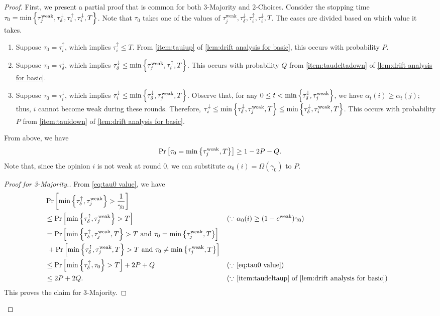 \documentclass[letterpaper,11pt]{article}
\newcommand{\alphanorm}{\gamma}
\newcommand{\cweak}{c^{\mathrm{weak}}}
\newcommand{\taudeltaup}{\tau^{\uparrow}_\delta}
\newcommand{\taudeltadown}{\tau^{\downarrow}_\delta}
\newcommand{\tauiup}{\tau^{\uparrow}_i}
\newcommand{\tauidown}{\tau^{\downarrow}_i}
\newcommand{\tauiweak}{\tau^{\mathrm{weak}}_i}
\newcommand{\taujweak}{\tau^{\mathrm{weak}}_j}
\begin{document}
\begin{proof}
  First, we present a partial proof that is common for both 3-Majority and 2-Choices.
  Consider the stopping time
  $ \tau_0 = \min\qty{ \taujweak,\taudeltadown,\tauiup,\tauidown, T } $.
  Note that $ \tau_0 $ takes one of the values of $ \taujweak,\taudeltadown,\tauiup,\tauidown,T$.
  The cases are divided based on which value it takes.
  \begin{enumerate}
  \item Suppose $ \tau_0 = \tauiup$, which implies $ \tauiup \le T $. From \cref{item:tauiup} of \cref{lem:drift analysis for basic}, this occurs with probability $P$. \label{item:multi tauiup}
  \item Suppose $ \tau_0 = \taudeltadown$, which implies $ \taudeltadown \le \min\qty{ \taujweak, \tauiup, T }$. This occurs with probability $ Q $ from \cref{item:taudeltadown} of \cref{lem:drift analysis for basic}. \label{item:multi taudeltadown}
  \item Suppose $ \tau_0 = \tauidown$, which implies $ \tauidown\le \min\qty{ \taudeltadown, \taujweak, T }$.
    Observe that, for any $ 0\le t < \min\qty{\taudeltadown,\taujweak} $, we have $ \alpha_t(i)\ge \alpha_t(j) $; thus, $ i $ cannot become weak during these rounds. Therefore, $ \tauidown\le \min\qty{ \taudeltadown, \taujweak, T } \le \min\qty{ \taudeltadown, \tauiweak, T }  $.  This occurs with probability $ P $ from \cref{item:tauidown} of \cref{lem:drift analysis for basic}. 
    \label{item:multi tauidown}
  \end{enumerate}
  From above, we have
  \begin{align} 
     \Pr\qty[ \tau_0 = \min\qty{\taujweak,T} ] \ge 1-2P-Q.  \label{eq:tau0 value}
  \end{align}
  Note that, since the opinion $ i $ is not weak at round $ 0 $, we can substitute $ \alpha_0(i)=\Omega(\alphanorm_0) $ to $ P $.

  \begin{proof}[Proof for 3-Majority.]
  From \cref{eq:tau0 value}, we have
  \begin{align*}
  &\Pr\qty[\min\qty{\taudeltaup,\taujweak}>\frac{1}{\alphanorm_0}]\\
  &\leq \Pr\qty[\min\qty{\taudeltaup,\taujweak}>T] &&(\text{$\because$ $\alpha_0(i)\geq (1-\cweak)\alphanorm_0$})\\
  &= \Pr\qty[\min\qty{\taudeltaup,\taujweak,T}>T \textrm{ and } \tau_0=\min\qty{\taujweak,T}]\\
  &\; + \Pr\qty[\min\qty{\taudeltaup,\taujweak,T}>T \textrm{ and } \tau_0\neq \min\qty{\taujweak,T}]\\
  &\leq \Pr\qty[\min\qty{\taudeltaup,\tau_0}>T] + 2P+Q &&(\text{$\because$ \cref{eq:tau0 value}})\\
  &\leq 2P+2Q. &&(\text{$\because$ \cref{item:taudeltaup} of \cref{lem:drift analysis for basic}})
  \end{align*}
  This proves the claim for 3-Majority.
  \end{proof}
  

\end{proof}
\end{document}
